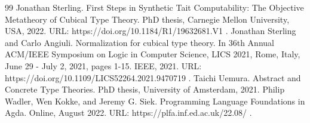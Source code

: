 \begin{thebibliography}{99}
 Jonathan Sterling. First Steps in Synthetic Tait Computability: The Objective Metatheory of Cubical Type Theory. PhD thesis, Carnegie Mellon University, USA, 2022. URL: https://doi.org/10.1184/R1/19632681.V1 .
 Jonathan Sterling and Carlo Angiuli. Normalization for cubical type theory. In 36th Annual ACM/IEEE Symposium on Logic in Computer Science, LICS 2021, Rome, Italy, June 29 - July 2, 2021, pages 1-15. IEEE, 2021. URL: https://doi.org/10.1109/LICS52264.2021.9470719 .
 Taichi Uemura. Abstract and Concrete Type Theories. PhD thesis, University of Amsterdam, 2021.
 Philip Wadler, Wen Kokke, and Jeremy G. Siek. Programming Language Foundations in Agda. Online, August 2022. URL: https://plfa.inf.ed.ac.uk/22.08/ .
\end{thebibliography}
